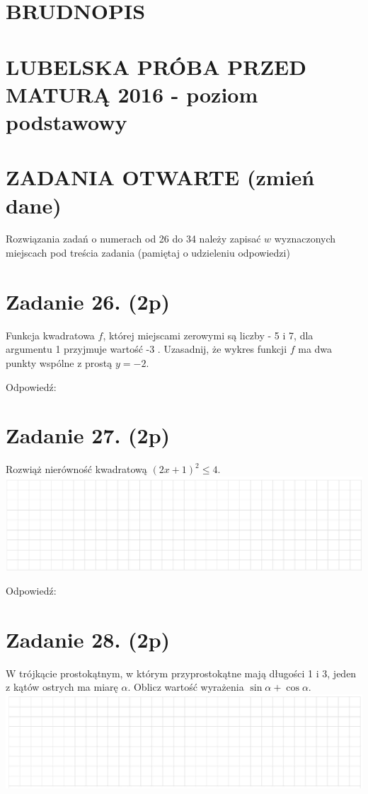 \documentclass[10pt]{article}
\begin{document}
\section*{BRUDNOPIS}
\section*{LUBELSKA PRÓBA PRZED MATURĄ 2016 - poziom podstawowy}
\section*{ZADANIA OTWARTE (zmień dane)}
Rozwiązania zadań o numerach od 26 do 34 należy zapisać \(w\) wyznaczonych miejscach pod treścia zadania (pamiętaj o udzieleniu odpowiedzi)

\section*{Zadanie 26. (2p)}
Funkcja kwadratowa \(f\), której miejscami zerowymi są liczby - 5 i 7, dla argumentu 1 przyjmuje wartość -3 . Uzasadnij, że wykres funkcji \(f\) ma dwa punkty wspólne z prostą \(y=-2\).

Odpowiedź:

\section*{Zadanie 27. (2p)}
Rozwiąż nierówność kwadratową \((2 x+1)^{2} \leq 4\).\\
\includegraphics[max width=\textwidth, center]{2024_11_21_0213a2175f3206eefc55g-08}

Odpowiedź:

\section*{Zadanie 28. (2p)}
W trójkącie prostokątnym, w którym przyprostokątne mają długości 1 i 3, jeden z kątów ostrych ma miarę \(\alpha\). Oblicz wartość wyrażenia \(\sin \alpha+\cos \alpha\).\\
\includegraphics[max width=\textwidth, center]{2024_11_21_0213a2175f3206eefc55g-08(1)}
\end{document}
